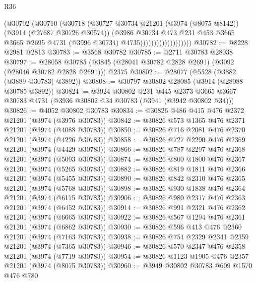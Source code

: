 \begin{lexlean}{R36}
\begin{coremodule}
                                (@30702
                                  (@30710
                                    (@30718
                                      (@30727
                                        @30734
                                        @21201
                                        (@3974 (@8075 @8142))
                                        (@3914 (@27687 @30726 @30574))
                                        (@3986
                                          @30734
                                          @473
                                          @231
                                          @453
                                          @3665
                                          @3665
                                          @2695
                                          @4731
                                          (@3996 @30734)
                                          @4735)))))))))))))))))))
@30782 := @8228 @2981 @2813
@30783 := @3568 @30782
@30785 := @2711 @30783 @28038
@30797 := @28058
    @30785
    (@3845 (@28041 @30782 @2828 @2691) (@3092 (@28046 @30782 @2828 @2691)))
    @2375
@30802 := @28077 (@5528 (@3882 (@3889 @30783) @3892))
@30808 := @30797 @30802 @28085 (@3914 (@28088 @30785 @3892))
@30824 := @3924
    @30802
    @231
    @445
    @2373
    @3665
    @3667
    @30783
    @4731
    (@3936 @30802 @34 @30783 (@3941 (@3942 @30802 @34)))
@30826 := @4052 @30802 @30783
@30834 := @30826 @486 @415 @476 @2372 @21201 (@3974 (@3976 @30783))
@30842 := @30826 @573 @1365 @476 @2371 @21201 (@3974 (@4088 @30783))
@30850 := @30826 @716 @2081 @476 @2370 @21201 (@3974 (@4226 @30783))
@30858 := @30826 @727 @2290 @476 @2369 @21201 (@3974 (@4429 @30783))
@30866 := @30826 @787 @2297 @476 @2368 @21201 (@3974 (@5093 @30783))
@30874 := @30826 @800 @1800 @476 @2367 @21201 (@3974 (@5265 @30783))
@30882 := @30826 @819 @1811 @476 @2366 @21201 (@3974 (@5455 @30783))
@30890 := @30826 @842 @2310 @476 @2365 @21201 (@3974 (@5768 @30783))
@30898 := @30826 @930 @1838 @476 @2364 @21201 (@3974 (@6175 @30783))
@30906 := @30826 @980 @2317 @476 @2363 @21201 (@3974 (@6452 @30783))
@30914 := @30826 @991 @2321 @476 @2362 @21201 (@3974 (@6665 @30783))
@30922 := @30826 @567 @1294 @476 @2361 @21201 (@3974 (@6862 @30783))
@30930 := @30826 @596 @413 @476 @2360 @21201 (@3974 (@7163 @30783))
@30938 := @30826 @754 @2329 @2341 @2359 @21201 (@3974 (@7365 @30783))
@30946 := @30826 @570 @2347 @476 @2358 @21201 (@3974 (@7719 @30783))
@30954 := @30826 @1123 @1905 @476 @2357 @21201 (@3974 (@8075 @30783))
@30960 := @3949 @30802 @30783 @609 @1570 @476 @780

\end{coremodule}
\end{lexlean}
